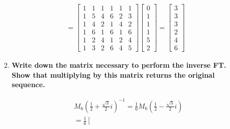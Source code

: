 \documentclass[a4paper,12pt]{article}
\begin{document}
\begin{enumerate}
\begin{enumerate}
\begin{align*}
                        = \left[ \begin{array}{cccccc}
                                1 & 1 & 1 & 1 & 1 & 1 \\
                                1 & 5 & 4 & 6 & 2 & 3 \\
                                1 & 4 & 2 & 1 & 4 & 2 \\
                                1 & 6 & 1 & 6 & 1 & 6 \\
                                1 & 2 & 4 & 1 & 2 & 4 \\
                                1 & 3 & 2 & 6 & 4 & 5
                        \end{array} \right]
                        \left[ \begin{array}{c}
                                0 \\
                                1 \\
                                1 \\
                                1 \\
                                5 \\
                                2
                        \end{array} \right]
                        = \left[ \begin{array}{c}
                                3 \\
                                3 \\
                                3 \\
                                2 \\
                                4 \\
                                6
                        \end{array} \right]
                    \end{align*}
                \item
                    \boldmath\textbf{Write down the matrix necessary to perform the inverse FT. Show that multiplying by this matrix returns the original sequence.
                    }\unboldmath \par
                    \iffalse
                        \begin{align*}
                            &M_6 \left( \frac{1}{2} + \frac{\sqrt{3}}{2}i \right)^{-1} = \frac{1}{6}M_6 \left( \frac{1}{2} - \frac{\sqrt{3}}{2}i \right) \\
                            &= \frac{1}{6} \left[ \begin{array}{cccccc}

\end{array}
\end{align*}
\end{enumerate}
\end{enumerate}
\end{document}
